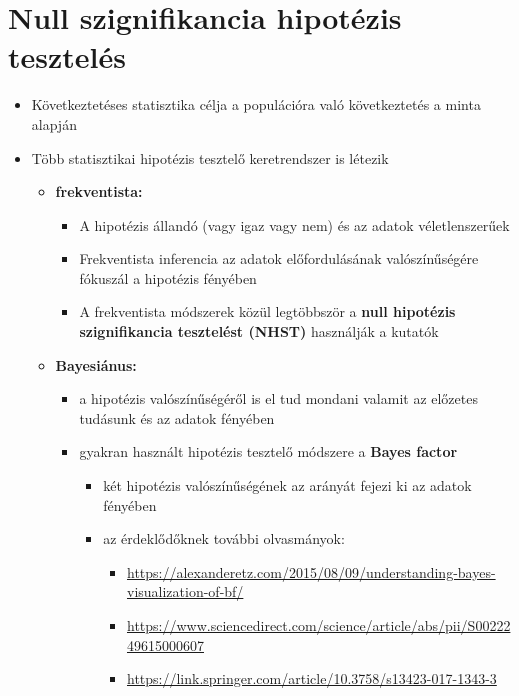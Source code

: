 \documentclass[
  letterpaper,
  DIV=11,
  numbers=noendperiod]{scrreprt}
\begin{document}

\hypertarget{null-szignifikancia-hipotuxe9zis-teszteluxe9s}{%
\chapter{Null szignifikancia hipotézis
tesztelés}\label{null-szignifikancia-hipotuxe9zis-teszteluxe9s}}

\begin{itemize}
\item
  Következtetéses statisztika célja a populációra való következtetés a
  minta alapján
\item
  Több statisztikai hipotézis tesztelő keretrendszer is létezik

  \begin{itemize}
  \item
    \textbf{frekventista:}

    \begin{itemize}
    \item
      A hipotézis állandó (vagy igaz vagy nem) és az adatok
      véletlenszerűek
    \item
      Frekventista inferencia az adatok előfordulásának valószínűségére
      fókuszál a hipotézis fényében
    \item
      A frekventista módszerek közül legtöbbször a \textbf{null
      hipotézis szignifikancia tesztelést (NHST)} használják a kutatók
    \end{itemize}
  \item
    \textbf{Bayesiánus:}

    \begin{itemize}
    \item
      a hipotézis valószínűségéről is el tud mondani valamit az előzetes
      tudásunk és az adatok fényében
    \item
      gyakran használt hipotézis tesztelő módszere a \textbf{Bayes
      factor}

      \begin{itemize}
      \item
        két hipotézis valószínűségének az arányát fejezi ki az adatok
        fényében
      \item
        az érdeklődőknek további olvasmányok:

        \begin{itemize}
        \item
          \url{https://alexanderetz.com/2015/08/09/understanding-bayes-visualization-of-bf/}
        \item
          \url{https://www.sciencedirect.com/science/article/abs/pii/S0022249615000607}
        \item
          \url{https://link.springer.com/article/10.3758/s13423-017-1343-3}
        \end{itemize}
      \end{itemize}
    \end{itemize}
  \end{itemize}
\end{itemize}
\end{document}

